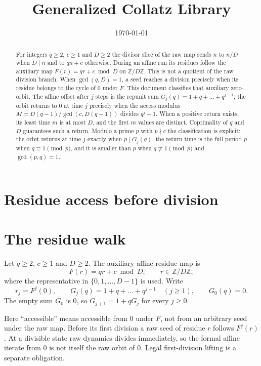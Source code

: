 \documentclass[11pt,letterpaper]{article}
\title{Generalized Collatz Library}
\author{}
\date{\today}
\begin{document}
\maketitle
\section*{Residue access before division}

\begin{abstract}
For integers \(q\ge2\), \(c\ge1\) and \(D\ge2\) the divisor slice of the raw
map sends \(n\) to \(n/D\) when \(D\mid n\) and to \(qn+c\) otherwise.
During an affine run its residues follow the auxiliary map
\(F(r)=qr+c\bmod D\) on \(\mathbb{Z}/D\mathbb{Z}\).
This is not a quotient of the raw division branch. When \(\gcd(q,D)=1\),
a seed reaches a division precisely when its residue belongs to the cycle
of \(0\) under \(F\). This document classifies that auxiliary zero-orbit.
The affine offset after \(j\) steps is the repunit sum
\(G_j(q)=1+q+\dots+q^{j-1}\); the orbit returns to \(0\) at time \(j\)
precisely when the access modulus
\(M=D(q-1)/\gcd(c,D(q-1))\) divides \(q^{j}-1\). When a positive return
exists, its least time \(m\) is at most \(D\), and the first \(m\) values
are distinct. Coprimality of \(q\) and \(D\) guarantees such a return. Modulo a prime \(p\) with \(p\nmid c\) the classification
is explicit: the orbit returns at time \(j\) exactly when \(p\mid G_j(q)\),
the return time is the full period \(p\) when \(q\equiv1\pmod p\), and it is
smaller than \(p\) when \(q\not\equiv1\pmod p\) and \(\gcd(p,q)=1\).
\end{abstract}

\section{The residue walk}

Let \(q\ge2\), \(c\ge1\) and \(D\ge2\). The auxiliary affine residue map is
\[
F(r)=qr+c\bmod D,\qquad r\in\mathbb{Z}/D\mathbb{Z},
\]
where the representative in \(\{0,1,\dots,D-1\}\) is used. Write
\[
r_j=F^j(0),\qquad G_j(q)=1+q+\dots+q^{j-1}\quad (j\ge1),\qquad G_0(q)=0 .
\]
The empty sum \(G_0\) is \(0\), so \(G_{j+1}=1+qG_j\) for every \(j\ge0\).

Here ``accessible'' means accessible from \(0\) under \(F\), not from an
arbitrary seed under the raw map. Before its first division a raw seed of
residue \(r\) follows \(F^j(r)\). At a divisible state raw dynamics divides
immediately, so the formal affine iterate from \(0\) is not itself the
raw orbit of \(0\). Legal first-division lifting is a separate obligation.
\end{document}
